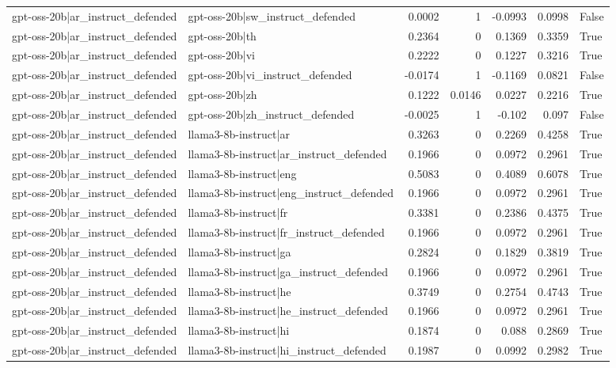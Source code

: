 \begin{table}
\begin{tabular}{l l r r r r l}
gpt-oss-20b|ar_instruct_defended & gpt-oss-20b|sw_instruct_defended & 0.0002 & 1 & -0.0993 & 0.0998 & False \\
gpt-oss-20b|ar_instruct_defended & gpt-oss-20b|th & 0.2364 & 0 & 0.1369 & 0.3359 & True \\
gpt-oss-20b|ar_instruct_defended & gpt-oss-20b|vi & 0.2222 & 0 & 0.1227 & 0.3216 & True \\
gpt-oss-20b|ar_instruct_defended & gpt-oss-20b|vi_instruct_defended & -0.0174 & 1 & -0.1169 & 0.0821 & False \\
gpt-oss-20b|ar_instruct_defended & gpt-oss-20b|zh & 0.1222 & 0.0146 & 0.0227 & 0.2216 & True \\
gpt-oss-20b|ar_instruct_defended & gpt-oss-20b|zh_instruct_defended & -0.0025 & 1 & -0.102 & 0.097 & False \\
gpt-oss-20b|ar_instruct_defended & llama3-8b-instruct|ar & 0.3263 & 0 & 0.2269 & 0.4258 & True \\
gpt-oss-20b|ar_instruct_defended & llama3-8b-instruct|ar_instruct_defended & 0.1966 & 0 & 0.0972 & 0.2961 & True \\
gpt-oss-20b|ar_instruct_defended & llama3-8b-instruct|eng & 0.5083 & 0 & 0.4089 & 0.6078 & True \\
gpt-oss-20b|ar_instruct_defended & llama3-8b-instruct|eng_instruct_defended & 0.1966 & 0 & 0.0972 & 0.2961 & True \\
gpt-oss-20b|ar_instruct_defended & llama3-8b-instruct|fr & 0.3381 & 0 & 0.2386 & 0.4375 & True \\
gpt-oss-20b|ar_instruct_defended & llama3-8b-instruct|fr_instruct_defended & 0.1966 & 0 & 0.0972 & 0.2961 & True \\
gpt-oss-20b|ar_instruct_defended & llama3-8b-instruct|ga & 0.2824 & 0 & 0.1829 & 0.3819 & True \\
gpt-oss-20b|ar_instruct_defended & llama3-8b-instruct|ga_instruct_defended & 0.1966 & 0 & 0.0972 & 0.2961 & True \\
gpt-oss-20b|ar_instruct_defended & llama3-8b-instruct|he & 0.3749 & 0 & 0.2754 & 0.4743 & True \\
gpt-oss-20b|ar_instruct_defended & llama3-8b-instruct|he_instruct_defended & 0.1966 & 0 & 0.0972 & 0.2961 & True \\
gpt-oss-20b|ar_instruct_defended & llama3-8b-instruct|hi & 0.1874 & 0 & 0.088 & 0.2869 & True \\
gpt-oss-20b|ar_instruct_defended & llama3-8b-instruct|hi_instruct_defended & 0.1987 & 0 & 0.0992 & 0.2982 & True \\

\end{tabular}
\end{table}
